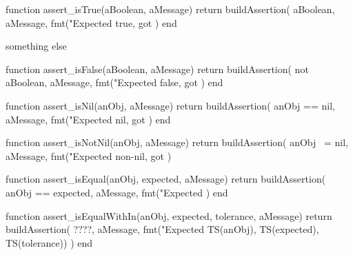 \stopTestCase
\stopTestSuite

\startTestSuite[title=assert_isBoolean]

\stopTestSuite

\startTestSuite[title=assert_isNotBoolean]

\stopTestSuite

\startTestSuite[title=assert_isTrue]

\startLuaCode

function assert_isTrue(aBoolean, aMessage)
  return buildAssertion(
    aBoolean,
    aMessage,
    fmt("Expected true, got %
  )
end

\stopLuaCode

\startTestCase[title=should succeed]

\startLuaTest
  something else
\stopLuaTest

\stopTestCase
\stopTestSuite

\startTestSuite[title=assert_isFalse]

\startLuaCode
function assert_isFalse(aBoolean, aMessage)
  return buildAssertion(
    not aBoolean,
    aMessage,
    fmt("Expected false, got %
  )
end
\stopLuaCode

\stopTestSuite

\startTestSuite[title=assert_isNil]

\startLuaCode
function assert_isNil(anObj, aMessage)
  return buildAssertion(
    anObj == nil,
    aMessage,
    fmt("Expected nil, got %
  )
end
\stopLuaCode

\stopTestSuite

\startTestSuite[title=assert_isNotNil]

\startLuaCode
function assert_isNotNil(anObj, aMessage)
  return buildAssertion(
    anObj ~= nil,
    aMessage,
    fmt("Expected non-nil, got %
  )
\stopLuaCode

\stopTestSuite

\startTestSuite[title=assert_isEqual]

\startLuaCode
function assert_isEqual(anObj, expected, aMessage)
  return buildAssertion(
    anObj == expected,
    aMessage,
    fmt("Expected %
  )
end
\stopLuaCode

\stopTestSuite

\startTestSuite[title=assert_isEqualWithIn]

\startLuaCode
function assert_isEqualWithIn(anObj, expected, tolerance, aMessage)
  return buildAssertion(
    ????,
    aMessage,
    fmt("Expected %
      TS(anObj), TS(expected), TS(tolerance))
  )
end
\stopLuaCode


